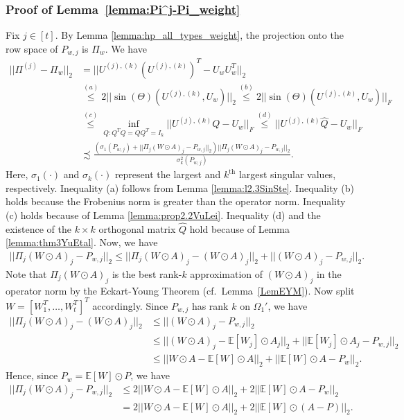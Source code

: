 \documentclass{article}
\begin{document}
\subsubsection{Proof of Lemma~\ref{lemma:Pi^j-Pi_weight}}
\label{AppPijWt}

Fix $j \in [t]$. By Lemma \ref{lemma:hp_all_types_weight}, the projection onto the row space of $P_{w, j}$ is $\Pi_w$. We have  
\begin{align*}
||\Pi^{(j)} - \Pi_w||_2 &= ||U^{(j), (k)}(U^{(j), (k)})^T - U_wU_w^T||_2 \\
%
& \stackrel{(a)}{\leq} 2||\sin(\Theta)(U^{(j), (k)}, U_w)||_2 \stackrel{(b)}{\leq} 2||\sin(\Theta)(U^{(j), (k)}, U_w)||_F\\
& \stackrel{(c)}{\leq} \mathop{\inf}_{Q: Q^TQ = QQ^T = I_k}||U^{(j), (k)}Q - U_w||_F \stackrel{(d)}{\leq} ||U^{(j), (k)}\hat{Q} - U_w||_F\\
&\precsim \frac{(\sigma_1(P_{w,j}) + ||\Pi_j(W \odot A)_j - P_{w, j}||_2)||\Pi_j(W \odot A)_j - P_{w, j}||_2}{\sigma^2_k(P_{w, j})}.
\end{align*}
Here, $\sigma_1(\cdot)$ and $\sigma_k(\cdot)$ represent the largest and $k^{\text{th}}$ largest singular values, respectively. Inequality (a) follows from Lemma \ref{lemma:l2.3SinSte}. Inequality (b) holds because the Frobenius norm is greater than the operator norm. Inequality (c) holds because of Lemma \ref{lemma:prop2.2VuLei}. Inequality (d) and the existence of the $k \times k$ orthogonal matrix $\hat{Q}$ hold because of Lemma \ref{lemma:thm3YuEtal}. Now, we have
\begin{align*}
||\Pi_j(W \odot A)_j - P_{w, j}||_2 \leq ||\Pi_j(W \odot A)_j - (W \odot A)_j||_2 + ||(W \odot A)_j - P_{w, j}||_2.  
\end{align*}
Note that $\Pi_j(W \odot A)_j$ is the best rank-$k$ approximation of $(W \odot A)_j$ in the operator norm by the Eckart-Young Theorem (cf.\ Lemma~\ref{LemEYM}). Now split $W = [W_1^T, \dots, W_t^T]^T$ accordingly. Since $P_{w, j}$ has rank $k$ on $\Omega_1'$, we have
\begin{align*}
||\Pi_j(W \odot A)_j - (W \odot A)_j||_2 & \leq ||(W \odot A)_j - P_{w, j}||_2 \\
%
& \leq ||(W \odot A)_j - \mathbb{E}[W_j]\odot A_j||_2 + ||\mathbb{E}[W_j]\odot A_j - P_{w, j}||_2 \\
%
& \leq ||W \odot A - \mathbb{E}[W]\odot A||_2 + ||\mathbb{E}[W]\odot A - P_w||_2.
\end{align*}
Hence, since $P_w = \mathbb{E}[W]\odot P$, we have
\begin{align*}
||\Pi_j(W \odot A)_j -  P_{w, j}||_2 &\leq 2||W \odot A - \mathbb{E}[W]\odot A||_2 + 2||\mathbb{E}[W]\odot A - P_w||_2\\
&= 2||W \odot A - \mathbb{E}[W]\odot A||_2 + 2||\mathbb{E}[W]\odot (A - P)||_2.
\end{align*}
\end{document}
